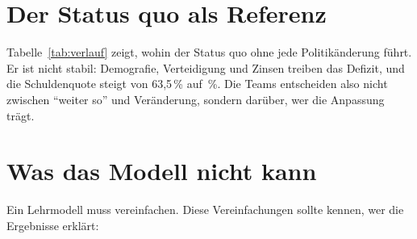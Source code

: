 \section{Der Status quo als Referenz}

Tabelle~\ref{tab:verlauf} zeigt, wohin der Status quo ohne jede Politikänderung führt. Er ist
nicht stabil: Demografie, Verteidigung und Zinsen treiben das Defizit, und die
Schuldenquote steigt von 63,5\,\% auf \SQschuldEnde\,\%. Die Teams entscheiden also nicht
zwischen \enquote{weiter so} und Veränderung, sondern darüber, wer die Anpassung trägt.

\begin{table}[!htb]
\centering\small

\caption{Status quo über fünf Perioden. BIP und Schuldenquote zu Beginn der Periode, übrige
Größen als Jahreswert der Periode, \COz{} kumuliert seit 2025 zu Periodenbeginn.}
\label{tab:verlauf}
\end{table}

\section{Was das Modell nicht kann}
\label{sec:grenzen}

Ein Lehrmodell muss vereinfachen. Diese Vereinfachungen sollte kennen, wer die Ergebnisse
erklärt:


